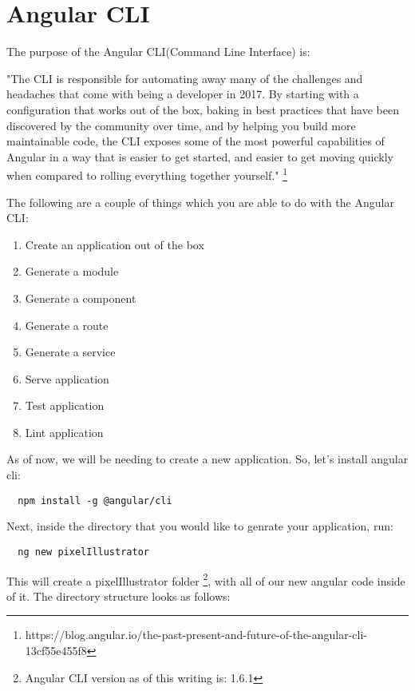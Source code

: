 
\maketitle{}
\section{ Angular CLI }

The purpose of the Angular CLI(Command Line Interface) is:

"The CLI is responsible for automating away many of the challenges and headaches
that come with being a developer in 2017. By starting with a configuration that
works out of the box, baking in best practices that have been discovered by the
community over time, and by helping you build more maintainable code, the CLI
exposes some of the most powerful capabilities of Angular in a way that is
easier to get started, and easier to get moving quickly when compared to rolling
everything together yourself." \footnote{https://blog.angular.io/the-past-present-and-future-of-the-angular-cli-13cf55e455f8}

The following are a couple of things which you are able to do with the Angular
CLI:

\begin{enumerate}
  \item Create an application out of the box
  \item Generate a module
  \item Generate a component
  \item Generate a route
  \item Generate a service
  \item Serve application
  \item Test application
  \item Lint application
\end{enumerate}

As of now, we will be needing to create a new application. So, let's install
angular cli:
\begin{verbatim}
  npm install -g @angular/cli
\end{verbatim}
Next, inside the directory that you would like to genrate your application, run:
\begin{verbatim}
  ng new pixelIllustrator
\end{verbatim}
This will create a pixelIllustrator folder \footnote{Angular CLI version as of
this writing is: 1.6.1}, with all of our new angular code
inside of it. The directory structure looks as follows:


